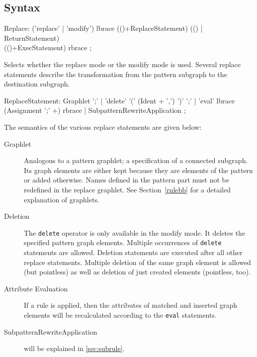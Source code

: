 \subsection{Syntax}

\begin{rail}
  Replace: ('replace' | 'modify') lbrace (()+ReplaceStatement) (() | ReturnStatement) \\
  (()+ExecStatement) rbrace ;
\end{rail}
Selects whether the replace mode or the modify mode is used. Several replace statements describe the transformation from the pattern subgraph to the destination subgraph.

\begin{rail}  
  ReplaceStatement:
    Graphlet ';' |
    'delete' '(' (Ident + ',') ')' ';' |
    'eval' lbrace (Assignment ';' +) rbrace |
    SubpatternRewriteApplication
    ;
\end{rail}
The semantics of the various replace statements are given below:
\begin{description}
  \item[Graphlet] Analogous to a pattern graphlet; a specification of a connected subgraph. Its graph elements are either kept because they are elements of the pattern or added otherwise. Names defined in the pattern part must not be redefined in the replace graphlet. See Section~\ref{rulebb} for a detailed explanation of graphlets. 
  \item[Deletion] The \texttt{delete} operator is only available in the modify mode. It deletes the specified pattern graph elements. Multiple occurrences of \texttt{delete} statements are allowed. Deletion statements are executed after all other replace statements. Multiple deletion of the same graph element is allowed (but pointless) as well as deletion of just created elements (pointless, too).
  \item[Attribute Evaluation] If a rule is applied, then the attributes of matched and inserted graph elements will be recalculated according to the \texttt{eval} statements.
  \item[SubpatternRewriteApplication] will be explained in \ref{sec:subrule}.
\end{description} 

